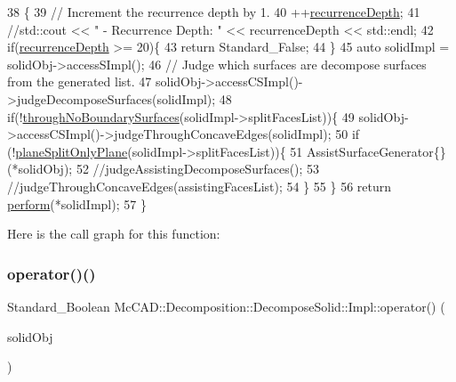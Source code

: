 \begin{DoxyCode}
38                                                   \{
39     \textcolor{comment}{// Increment the recurrence depth by 1.}
40     ++\hyperlink{classMcCAD_1_1Decomposition_1_1DecomposeSolid_1_1Impl_ad908b2687b52f636d8368b814aa5f770}{recurrenceDepth};
41     \textcolor{comment}{//std::cout << "     - Recurrence Depth: " << recurrenceDepth << std::endl;}
42     \textcolor{keywordflow}{if}(\hyperlink{classMcCAD_1_1Decomposition_1_1DecomposeSolid_1_1Impl_ad908b2687b52f636d8368b814aa5f770}{recurrenceDepth} >= 20)\{
43         \textcolor{keywordflow}{return} Standard\_False;
44     \}
45     \textcolor{keyword}{auto} solidImpl = solidObj->accessSImpl();
46     \textcolor{comment}{// Judge which surfaces are decompose surfaces from the generated list.}
47     solidObj->accessCSImpl()->judgeDecomposeSurfaces(solidImpl);
48     \textcolor{keywordflow}{if}(!\hyperlink{classMcCAD_1_1Decomposition_1_1DecomposeSolid_1_1Impl_aade70e5860e8ee29ff8f9e4c4cfc53b9}{throughNoBoundarySurfaces}(solidImpl->splitFacesList))\{
49         solidObj->accessCSImpl()->judgeThroughConcaveEdges(solidImpl);
50          \textcolor{keywordflow}{if} (!\hyperlink{classMcCAD_1_1Decomposition_1_1DecomposeSolid_1_1Impl_a2000d66a4d389e32550b981c5b82ba8a}{planeSplitOnlyPlane}(solidImpl->splitFacesList))\{
51              AssistSurfaceGenerator\{\}(*solidObj);
52              \textcolor{comment}{//judgeAssistingDecomposeSurfaces();}
53              \textcolor{comment}{//judgeThroughConcaveEdges(assistingFacesList);}
54          \}
55     \}
56     \textcolor{keywordflow}{return} \hyperlink{classMcCAD_1_1Decomposition_1_1DecomposeSolid_1_1Impl_aa65d0c829adf71764f3d1954cd8d6829}{perform}(*solidImpl);
57 \}
\end{DoxyCode}
Here is the call graph for this function\+:
\mbox{\label{classMcCAD_1_1Decomposition_1_1DecomposeSolid_1_1Impl_a8038247034f4fbe8ac347bd59bbfe8c9}} 
\subsubsection{\texorpdfstring{operator()()}{operator()()}\hspace{0.1cm}{\footnotesize\ttfamily [4/6]}}
{\footnotesize\ttfamily Standard\+\_\+\+Boolean Mc\+C\+A\+D\+::\+Decomposition\+::\+Decompose\+Solid\+::\+Impl\+::operator() (\begin{DoxyParamCaption}\item[{std\+::shared\+\_\+ptr$<$ \hyperlink{classMcCAD_1_1Geometry_1_1CYLSolid}{Geometry\+::\+C\+Y\+L\+Solid} $>$ \&}]{solid\+Obj }\end{DoxyParamCaption})}

